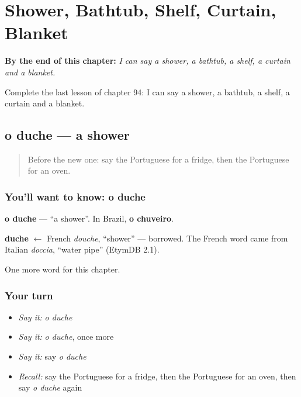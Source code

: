 
\chapter{Shower, Bathtub, Shelf, Curtain, Blanket}
\label{ch:pt-shower-bathtub-shelf-curtain-blanket}

\begin{chapteropening}
\textbf{By the end of this chapter:} \emph{I can say a shower, a bathtub, a shelf, a curtain and a blanket.}

Complete the last lesson of chapter 94: I can say a shower, a bathtub, a shelf, a curtain and a blanket.
\end{chapteropening}

\section[o duche]{o duche — a shower}

\label{lesson:PT-C94-duche}



\begin{quote}
Before the new one: say the Portuguese for a fridge, then the Portuguese for an oven.
\end{quote}

\subsection*{You'll want to know: o duche}
\textbf{o duche} — \textquotedblleft{}a shower\textquotedblright{}. In Brazil, \textbf{o chuveiro}.

\begin{cousinweb}
\textbf{duche} $\leftarrow$ French \emph{douche}, \textquotedblleft{}shower\textquotedblright{} — borrowed. The French word came from Italian \emph{doccia}, \textquotedblleft{}water pipe\textquotedblright{} (EtymDB 2.1).
\end{cousinweb}

\begin{grammarlens}[title={What you've built}]
One more word for this chapter.
\end{grammarlens}

\subsection*{Your turn}
\begin{itemize}
\raggedright
  \item \emph{Say it:} \emph{o duche}
  \item \emph{Say it:} \emph{o duche}, once more
  \item \emph{Say it:} say \emph{o duche}
  \item \emph{Recall:} say the Portuguese for a fridge, then the Portuguese for an oven, then say \emph{o duche} again
\end{itemize}

